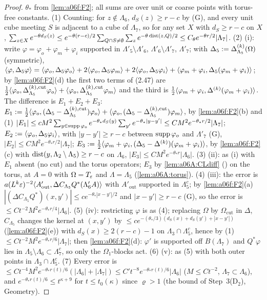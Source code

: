 \begin{proof}
$\theta_*$ from \cref{lem:a06f:F2}; all sums are over unit or coarse points with torus-free constants. (1) Counting: for $z\notin\Lambda_6$, $d_S(z)\ge r-c$ by (G), and every unit cube meeting $S$ is adjacent to a cube of $\Lambda_7$, so for any set $X$ with $d_S\ge r-c$ on $X$, $\sum_{z\in X}e^{-\theta d_S(z)}\le e^{-\theta(r-c)/2}\sum_{Q\cap S\ne\emptyset}\sum_ze^{-\theta\operatorname{dist}(z,Q)/2}\le C_\theta e^{-\theta r/2}|\Lambda_7|$. (2) (i): write $\varphi=\varphi_o+\varphi_m+\varphi_i$ supported in $\Lambda'_5\setminus\Lambda'_6$, $\Lambda'_6\setminus\Lambda'_7$, $\Lambda'_7$; with $\Delta_5:=\Delta^{(k)}_{\Lambda_5}(\Omega)$ (symmetric), $\langle \varphi,\Delta_5\varphi\rangle=\langle \varphi_o,\Delta_5\varphi_o\rangle+2\langle \varphi_o,\Delta_5\varphi_m\rangle+2\langle \varphi_o,\Delta_5\varphi_i\rangle+\langle \varphi_m+\varphi_i,\Delta_5(\varphi_m+\varphi_i)\rangle$; by \cref{lem:a06f:F2}(d) the first two terms of (2.47) are $\frac12\langle \varphi_o,\Delta^{(k),\mathrm{cut}}_{\Lambda_5}\varphi_o\rangle+\langle \varphi_o,\Delta^{(k),\mathrm{cut}}_{\Lambda_5}\varphi_m\rangle$ and the third is $\frac12\langle \varphi_m+\varphi_i,\Delta^{(k)}(\varphi_m+\varphi_i)\rangle$. The difference is $E_1+E_2+E_3$: $E_1:=\frac12\langle \varphi_o,(\Delta_5-\Delta^{(k),\mathrm{cut}}_{\Lambda_5})\varphi_o\rangle+\langle \varphi_o,(\Delta_5-\Delta^{(k),\mathrm{cut}}_{\Lambda_5})\varphi_m\rangle$, by \cref{lem:a06f:F2}(b) and (1) $|E_1|\le cM^2\sum_{y\in\operatorname{supp}\varphi_o}e^{-\theta_*d_S(y)}\sum_{y'}e^{-\theta_*|y-y'|}\le CM^2e^{-\theta_*r/2}|\Lambda_7|$; $E_2:=\langle \varphi_o,\Delta_5\varphi_i\rangle$, with $|y-y'|\ge r-c$ between $\operatorname{supp}\varphi_o$ and $\Lambda'_7$ (G), $|E_2|\le CM^2e^{-\theta_*r/2}|\Lambda_7|$; $E_3:=\frac12\langle \varphi_m+\varphi_i,(\Delta_5-\Delta^{(k)})(\varphi_m+\varphi_i)\rangle$, by \cref{lem:a06f:F2}(c) with $\operatorname{dist}(y,\Lambda_2\setminus\Lambda_5)\ge r-c$ on $\Lambda_6$, $|E_3|\le CM^2e^{-\theta_*r}|\Lambda_6|$. (3) (ii): as (i) with $E_1$ absent (no cut) and the torus operators; $E_3$ by \cref{lem:a06A:CLdiff} (\cite[(1.18)]{Ba4}) on the torus, at $A=0$ with $\Omega=T_{\varepsilon}$ and $\Lambda=\Lambda_5$ (\cref{lem:a06A:torus}). (4) (iii): the error is $a(L^k\varepsilon)^{-2}\langle A'_{\mathrm{out}},\Delta C_{\Lambda_5}Q^*(\Lambda'_6A)\rangle$ with $A'_{\mathrm{out}}$ supported in $\Lambda_5^c$; by \cref{lem:a06f:F2}(a) $|(\Delta C_{\Lambda_5}Q^*)(x,y')|\le ce^{-\theta_*|x-y'|/2}$ and $|x-y'|\ge r-c$ (G), so the error is $\le Ct^{-2}M^2e^{-\theta_*r/4}|\Lambda_6|$. (5) (iv): restricting $\varphi$ is as (4); replacing $\Omega$ by $\Omega_{\mathrm{cut}}$ in $\Delta$, $C_{\Lambda_5}$ changes the kernel at $(x,y')$ by $\le ce^{-(\theta_*/3)(d_S(x)+d_S(y')+|x-y'|)}$ (\cref{lem:a06f:F2}(e)) with $d_S(x)\ge2(r-c)-1$ on $\Lambda_3\cap\Lambda_5^c$, hence by (1) $\le Ct^{-2}M^2e^{-\theta_*r/6}|\Lambda_7|$; then \cref{lem:a06f:F2}(d): $\varphi'$ is supported off $B(\Lambda_7)$ and $Q^*\varphi$ lies in $\Lambda_5\setminus\Lambda_6\subset\Lambda_7^c$, so only the $\Omega_1$-blocks act. (6) (v): as (5) with both outer points in $\Lambda_3\cap\Lambda_5^c$. (7) Every error is $\le Ct^{-4}M^2e^{-\theta_*r(t)/6}(|\Lambda_6|+|\Lambda_7|)\le C't^{-8}e^{-\theta_*r(t)/6}|\Lambda_6|$ ($M\le Ct^{-2}$, $\Lambda_7\subset\Lambda_6$), and $e^{-\theta_*r(t)/6}\le t^{\kappa+9}$ for $t\le t_0(\kappa)$ since $\varrho>1$ (the bound of Step~3(D$_2$), Geometry).

\end{proof}
